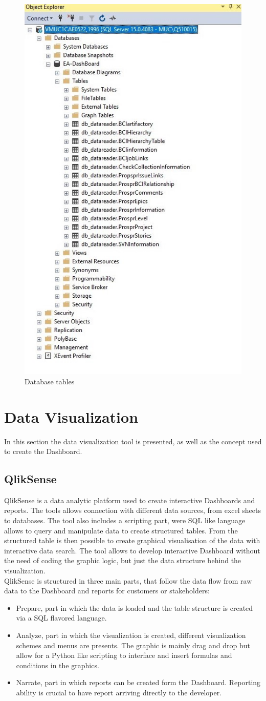 \documentclass[../main.tex]{subfiles}
\begin{document}
\begin{figure}[H]
    \centering
    \includegraphics[width=0.5\linewidth]{images_folder/databasetable.jpg}
    \caption{Database tables}
    \label{fig:dbtables}
\end{figure} 

\section{Data Visualization}
In this section the data visualization tool is presented, as well as the concept used to create the Dashboard. 
\subsection{QlikSense}
QlikSense is a data analytic platform used to create interactive Dashboards and reports. The tools allows connection with different data sources, from excel sheets to databases. The tool also includes a scripting part, were SQL like language allows to query and manipulate data to create structured tables. From the structured table is then possible to create graphical visualisation of the data with interactive data search. The tool allows to develop interactive Dashboard without the need of coding the graphic logic, but just the data structure behind the visualization.\\
QlikSense is structured in three main parts, that follow the data flow from raw data to the Dashboard and reports for customers or stakeholders:
\begin{itemize}
    \item Prepare, part in which the data is loaded and the table structure is created via a SQL flavored language. 
    \item Analyze, part in which the visualization is created, different visualization schemes and menus are presents. The graphic is mainly drag and drop but allow for a Python like scripting to interface and insert formulas and conditions in the graphics.
    \item Narrate, part in which reports can be created form the Dashboard. Reporting ability is crucial to have report arriving directly to the developer.  
\end{itemize}
\end{document}
